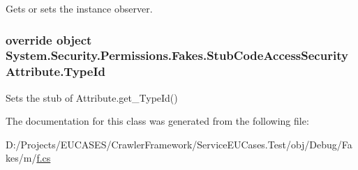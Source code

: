 Gets or sets the instance observer.

\hypertarget{class_system_1_1_security_1_1_permissions_1_1_fakes_1_1_stub_code_access_security_attribute_a344a5c2c3bbb033bed49694413b19730}{
\subsubsection[{Type\-Id}]{\setlength{\rightskip}{0pt plus 5cm}override object System.\-Security.\-Permissions.\-Fakes.\-Stub\-Code\-Access\-Security\-Attribute.\-Type\-Id\hspace{0.3cm}{\ttfamily [get]}}}\label{class_system_1_1_security_1_1_permissions_1_1_fakes_1_1_stub_code_access_security_attribute_a344a5c2c3bbb033bed49694413b19730}


Sets the stub of Attribute.\-get\-\_\-\-Type\-Id()



The documentation for this class was generated from the following file\-:\begin{DoxyCompactItemize}
\item 
D\-:/\-Projects/\-E\-U\-C\-A\-S\-E\-S/\-Crawler\-Framework/\-Service\-E\-U\-Cases.\-Test/obj/\-Debug/\-Fakes/m/\hyperlink{m_2f_8cs}{f.\-cs}\end{DoxyCompactItemize}
